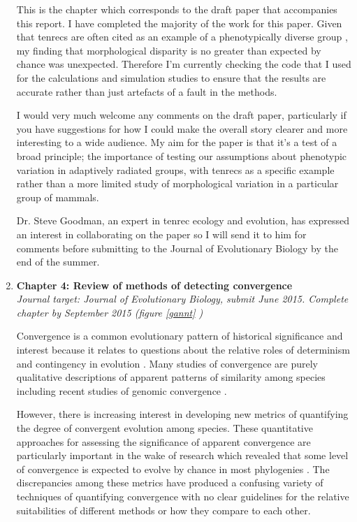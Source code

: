 \documentclass[12pt,a4paper]{article}
\begin{document}
\begin{enumerate}
This is the chapter which corresponds to the draft paper that accompanies this report. I have completed the majority of the work for this paper. Given that tenrecs are often cited as an example of a phenotypically diverse group \citep[e.g.][]{Olson2013}, my finding that morphological disparity is no greater than expected by chance was unexpected. Therefore I'm currently checking the code that I used for the calculations and simulation studies to ensure that the results are accurate rather than just artefacts of a fault in the methods. 

I would very much welcome any comments on the draft paper, particularly if you have suggestions for how I could make the overall story clearer and more interesting to a wide audience. My aim for the paper is that it's a test of a broad principle; the importance of testing our assumptions about phenotypic variation in adaptively radiated groups, with tenrecs as a specific example rather than a more limited study of morphological variation in a particular group of mammals.

Dr. Steve Goodman, an expert in tenrec ecology and evolution, has expressed an interest in collaborating on the paper so I will send it to him for comments before submitting to the Journal of Evolutionary Biology by the end of the summer.

\item \textbf{Chapter 4: Review of methods of detecting convergence}\\
\textit{Journal target: Journal of Evolutionary Biology, submit June 2015. Complete chapter by September 2015 (figure  \ref{gannt} )}

Convergence is a common evolutionary pattern of historical significance and interest because it relates to questions about the relative roles of determinism and contingency in evolution \citep[c.f][]{Blount2008}. Many studies of convergence are purely qualitative descriptions of apparent patterns of similarity among species \citep[e.g.][]{Ben-Moshe2001, Leal2002, Fleischer2008} including recent studies of genomic convergence \citep{Jones2012, Parker2013}. 

However, there is increasing interest in developing new metrics of quantifying the degree of convergent evolution among species. These quantitative approaches for assessing the significance of apparent convergence are particularly important in the wake of research which revealed that some level of convergence is expected to evolve by chance in most phylogenies \citep{Stayton2008}.
The discrepancies among these metrics have produced a confusing variety of techniques of quantifying convergence with no clear guidelines for the relative suitabilities of different methods or how they compare to each other.
   


\end{enumerate}
\end{document}

